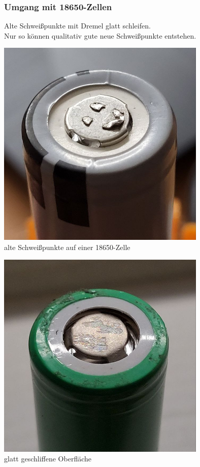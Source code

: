 \documentclass[handout, usenames,dvipsnames, nosymbols,aspectratio=169]{beamer}
\begin{document}
	\begin{frame}
		\frametitle{Umgang mit 18650-Zellen}
		Alte Schweißpunkte mit Dremel glatt schleifen.\\ Nur so können qualitativ gute neue Schweißpunkte entstehen.\\[1em]
		\hspace{2em}
		\begin{minipage}{0.4\textwidth}
			\centering
			\includegraphics[width=0.75\textwidth]{images/photo_2024-03-16_01-08-52.jpg}\\
			alte Schweißpunkte auf einer 18650-Zelle	
		\end{minipage}
		\hspace{1em}
		\begin{minipage}{0.4\textwidth}
			\centering
			\includegraphics[width=0.75\textwidth]{images/photo_2024-03-16_01-08-55.jpg}\\
			glatt geschliffene Oberfläche\\
			\vfill
		\end{minipage}
	\end{frame}
	
\end{document}
